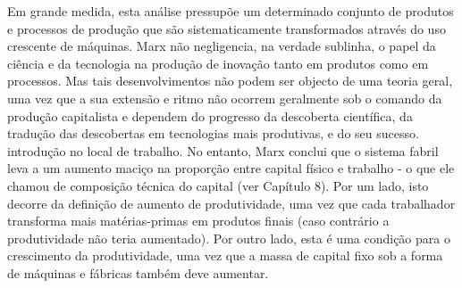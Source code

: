  \par 
Em grande medida, esta análise pressupõe um determinado conjunto de produtos e processos de produção que são sistematicamente transformados através do uso crescente de máquinas. Marx não negligencia, na verdade sublinha, o papel da ciência e da tecnologia na produção de inovação tanto em produtos como em processos. Mas tais desenvolvimentos não podem ser objecto de uma teoria geral, uma vez que a sua extensão e ritmo não ocorrem geralmente sob o comando da produção capitalista e dependem do progresso da descoberta científica, da tradução das descobertas em tecnologias mais produtivas, e do seu sucesso. introdução no local de trabalho. No entanto, Marx conclui que o sistema fabril leva a um aumento maciço na proporção entre capital físico e trabalho - o que ele chamou de composição técnica do capital (ver Capítulo {\color{blue}8}). Por um lado, isto decorre da definição de aumento de produtividade, uma vez que cada trabalhador transforma mais matérias-primas em produtos finais (caso contrário a produtividade não teria aumentado). Por outro lado, esta é uma condição para o crescimento da produtividade, uma vez que a massa de capital fixo sob a forma de máquinas e fábricas também deve aumentar.
 \par 
